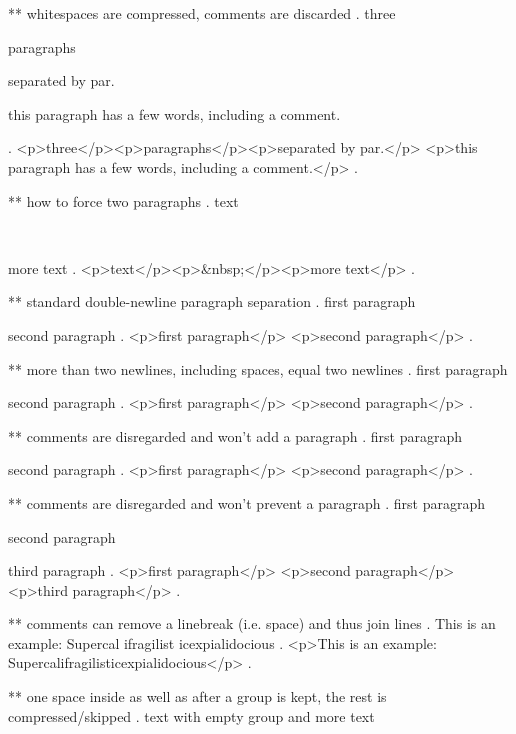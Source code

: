 ** whitespaces are compressed, comments are discarded
.
three
\par

paragraphs
    \par\par
 separated by par.

   this     paragraph  has a 	    few 
 words,   including
 a comment.


 
.
<p>three</p><p>paragraphs</p><p>separated by par.</p>
<p>this paragraph has a few words, including a comment.</p>
.


** how to force two paragraphs
.
text  \par
~
\par
more text
.
<p>text</p><p>&nbsp;</p><p>more text</p>
.


** standard double-newline paragraph separation
.
first paragraph

 second paragraph
.
<p>ﬁrst paragraph</p>
<p>second paragraph</p>
.



** more than two newlines, including spaces, equal two newlines
.
first paragraph

   
  


second paragraph
.
<p>ﬁrst paragraph</p>
<p>second paragraph</p>
.


** comments are disregarded and won't add a paragraph
.
first paragraph




second paragraph
.
<p>ﬁrst paragraph</p>
<p>second paragraph</p>
.

** comments are disregarded and won't prevent a paragraph
.
first paragraph %

second paragraph%

third paragraph
.
<p>ﬁrst paragraph</p>
<p>second paragraph</p>
<p>third paragraph</p>
.


** comments can remove a linebreak (i.e. space) and thus join lines
.
This is an %
example: Supercal%
              ifragilist%
    icexpialidocious
.
<p>This is an example: Supercalifragilisticexpialidocious</p>
.



** one space inside as well as after a group is kept, the rest is compressed/skipped
.
text with empty group {  } and more text

